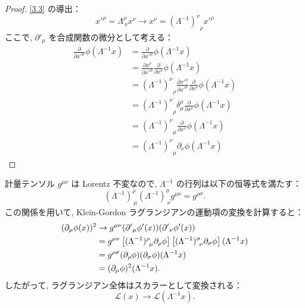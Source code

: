 \documentclass[a4paper,12pt]{article}
\begin{document}
\color{blue}
\begin{proof}
\eqref{3.3} の導出：
\begin{equation*}
  x'^\rho = \Lambda^\rho_{\ \nu} x^\nu  \to  x^{\nu} = {(\Lambda^{-1})^{\nu}}_{\rho} x'^{\rho} \tag{3-1.b1}
\end{equation*}
ここで, $\partial'_{\mu}$ を合成関数の微分として考える：
\begin{align*}
  \frac{\partial}{\partial x'^{\mu}} \phi(\Lambda^{-1}x) &= \frac{\partial}{\partial x'^{\mu}} \phi(\Lambda^{-1}x) \tag{3-1.b2} \\
  &= \frac{\partial x^{\nu}}{\partial x'^{\mu}} \frac{\partial}{\partial x^{\nu}} \phi(\Lambda^{-1}x) \tag{3-1.b3} \\
  &= {(\Lambda^{-1})^{\nu}}_{\rho} \frac{\partial x'^{\rho}}{\partial x'^{\mu}} \frac{\partial}{\partial x^{\nu}} \phi(\Lambda^{-1}x) \tag{3-1.b4} \\
  &= {(\Lambda^{-1})^{\nu}}_{\rho} \delta^{\rho}_{\mu} \frac{\partial}{\partial x^{\nu}} \phi(\Lambda^{-1}x) \tag{3-1.b5} \\
  &= {(\Lambda^{-1})^{\nu}}_{\mu} \frac{\partial}{\partial x^{\nu}} \phi(\Lambda^{-1}x) \tag{3-1.b6} \\
  &= {(\Lambda^{-1})^{\nu}}_{\mu} \partial_\nu \phi(\Lambda^{-1}x) \tag{3-1.b7}
\end{align*}
\end{proof}
\color{black}
計量テンソル $g^{\mu\nu}$ は Lorentz 不変なので, $\Lambda^{-1}$ の行列は以下の恒等式を満たす：
\begin{equation*}
(\Lambda^{-1})^\rho_{\ \mu} (\Lambda^{-1})^\sigma_{\ \nu} g^{\mu\nu} = g^{\rho\sigma}. \label{3.4}\tag{3.4}
\end{equation*}
この関係を用いて, Klein-Gordon ラグランジアンの運動項の変換を計算すると：
\begin{align*}
(\partial_\mu \phi(x))^2 &\rightarrow g^{\mu\nu} (\partial{\textcolor{blue}{'}}_\mu \phi'(x)) (\partial{\textcolor{blue}{'}}_\nu \phi'(x)) \\
&= g^{\mu\nu} \left[ (\Lambda^{-1})^\rho_{\ \mu} \partial_\rho \phi \right] \left[ (\Lambda^{-1})^\sigma_{\ \nu} \partial_\sigma \phi \right](\Lambda^{-1}x) \\
&= g^{\rho\sigma} (\partial_\rho \phi)(\partial_\sigma \phi)(\Lambda^{-1}x) \\
&= (\partial_\mu \phi)^2(\Lambda^{-1}x).
\end{align*}
したがって, ラグランジアン全体はスカラーとして変換される：
\begin{equation*}
\mathcal{L}(x) \rightarrow \mathcal{L}(\Lambda^{-1}x). \tag{3.5}
\end{equation*}
\end{document}
